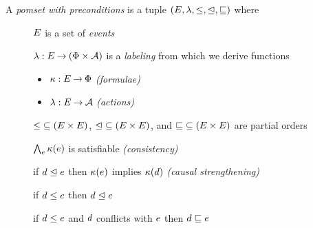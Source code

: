 \begin{definition}
  A \emph{pomset with preconditions} is a tuple
  $(E, \lambda, {\le}, {\trianglelefteq}, {\sqsubseteq})$ where
  \begin{description}
  \item[{}] $E$ is a set of \emph{events}
  \item[{}]
    $\lambda: E \mathbin\rightarrow (\Phi\times\mathcal{A})$ is a \emph{labeling} from
    which we derive functions
    \begin{itemize}
    \item $\kappa:E\mathbin\rightarrow\Phi$
      \emph{(formulae)} %
    \item $\lambda:E\mathbin\rightarrow\mathcal{A}$
      \emph{(actions)} %
    \end{itemize}
  \item[{}]
    ${\le} \subseteq (E\times E)$,
    ${\trianglelefteq} \subseteq (E\times E)$, and
    ${\sqsubseteq} \subseteq (E\times E)$ are partial orders
  \item[{}] $\bigwedge_{e}\kappa(e)$ is satisfiable \emph{(consistency)}
  \item[{}] if $d\trianglelefteq e$ then $\kappa(e)$ implies $\kappa(d)$ \emph{(causal strengthening)} 
  \item[{}] if $d\le e$ then $d\trianglelefteq e$
  \item[{}] if $d\le e$ and $d$ conflicts with $e$ then $d\sqsubseteq e$
  \end{description}
\end{definition}





